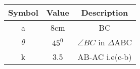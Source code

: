 \begin{tabular}{|c|c|c|}
  \hline
  \textbf{Symbol}&\textbf{Value}&\textbf{Description}\\
  \hline
  a & 8cm & BC\\
  \hline
  $\theta$ & $45^0$ & $\angle{BC}$ in $\Delta$ABC \\
  \hline
	k & 3.5 & AB-AC i.e(c-b)\\
  \hline
\end{tabular}
